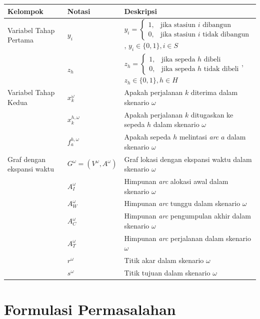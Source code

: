\begin{table}[H]
\centering
\begin{tabular}{@{}p{}p{}p{}@{}}
\toprule
Kelompok & Notasi & Deskripsi \\
\midrule
Variabel Tahap Pertama & $y_i $ & $
y_i = 
\begin{cases} 
1, & \text{jika stasiun } i \text{ dibangun} \\
0, & \text{jika stasiun } i \text{ tidak dibangun}
\end{cases}
$, $y_i \in \{0,1\}, i \in S $ \\
& $z_h$ & $
z_h = 
\begin{cases} 
1, & \text{jika sepeda } h \text{ dibeli} \\
0, & \text{jika sepeda } h \text{ tidak dibeli}
\end{cases}
$, $z_h \in \{0,1\}, h \in H $ \\
\midrule
Variabel Tahap Kedua & $x_k^\omega$ & Apakah perjalanan $k$ diterima dalam skenario $\omega$ \\
& $x_k^{h,\omega}$ & Apakah perjalanan $k$ ditugaskan ke sepeda $h$ dalam skenario $\omega$ \\
& $f_a^{h,\omega}$ & Apakah sepeda $h$ melintasi \textit{arc} $a$ dalam skenario $\omega$ \\
\midrule
Graf dengan ekspansi waktu & $G^\omega = (V^\omega, A^\omega)$ & Graf lokasi dengan ekspansi waktu dalam skenario $\omega$ \\
& $A_I^\omega$ & Himpunan \textit{arc} alokasi awal dalam skenario $\omega$ \\
& $A_W^\omega$ & Himpunan \textit{arc} tunggu dalam skenario $\omega$ \\
& $A_C^\omega$ & Himpunan \textit{arc} pengumpulan akhir dalam skenario $\omega$ \\
& $A_T^\omega$ & Himpunan \textit{arc} perjalanan dalam skenario $\omega$ \\
& $r^\omega$ & Titik akar dalam skenario $\omega$ \\
& $s^\omega$ & Titik tujuan dalam skenario $\omega$ \\
\bottomrule
\end{tabular}
\end{table}

\section{Formulasi Permasalahan}

